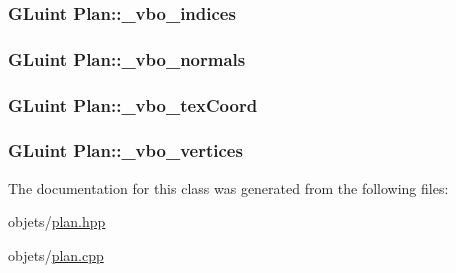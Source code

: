 \hypertarget{class_plan_ad8791ad67d66ac1b24792dc72ec00c64}{
\subsubsection[{\+\_\+vbo\+\_\+indices}]{\setlength{\rightskip}{0pt plus 5cm}G\+Luint Plan\+::\+\_\+vbo\+\_\+indices\hspace{0.3cm}{\ttfamily [private]}}}\label{class_plan_ad8791ad67d66ac1b24792dc72ec00c64}
\hypertarget{class_plan_aa5db33661be2dfcecf68683c33eb22b9}{
\subsubsection[{\+\_\+vbo\+\_\+normals}]{\setlength{\rightskip}{0pt plus 5cm}G\+Luint Plan\+::\+\_\+vbo\+\_\+normals\hspace{0.3cm}{\ttfamily [private]}}}\label{class_plan_aa5db33661be2dfcecf68683c33eb22b9}
\hypertarget{class_plan_a3c16becd29f35260b79af8b9cb6fa892}{
\subsubsection[{\+\_\+vbo\+\_\+tex\+Coord}]{\setlength{\rightskip}{0pt plus 5cm}G\+Luint Plan\+::\+\_\+vbo\+\_\+tex\+Coord\hspace{0.3cm}{\ttfamily [private]}}}\label{class_plan_a3c16becd29f35260b79af8b9cb6fa892}
\hypertarget{class_plan_a7b203dc36964da663836cf7614fe711a}{
\subsubsection[{\+\_\+vbo\+\_\+vertices}]{\setlength{\rightskip}{0pt plus 5cm}G\+Luint Plan\+::\+\_\+vbo\+\_\+vertices\hspace{0.3cm}{\ttfamily [private]}}}\label{class_plan_a7b203dc36964da663836cf7614fe711a}


The documentation for this class was generated from the following files\+:\begin{DoxyCompactItemize}
\item 
objets/\hyperlink{plan_8hpp}{plan.\+hpp}\item 
objets/\hyperlink{plan_8cpp}{plan.\+cpp}\end{DoxyCompactItemize}
